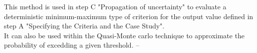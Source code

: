     \Methodology
        {
          This method is used in step C "Propagation of uncertainty" to evaluate a deterministic minimum-maximum type of criterion for the output value defined in step A "Specifying the Criteria and the Case Study".\\
          It can also be used within the Quasi-Monte carlo technique to approximate the probability of excedding a given threshold.
        }
        {
          --
        }
